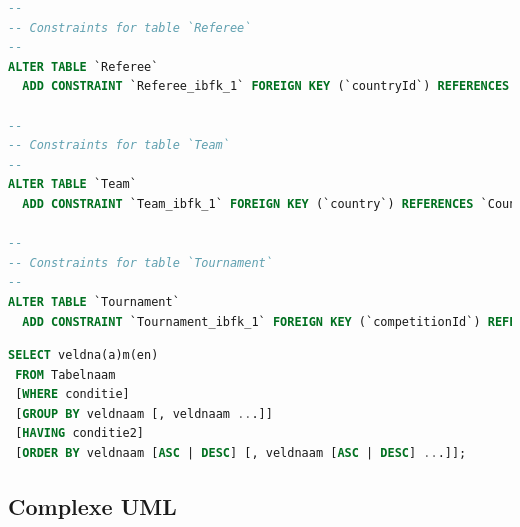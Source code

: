 \documentclass[11pt]{article}
\begin{document}
\begin{framed}
\begin{lstlisting}[language=sql]
--
-- Constraints for table `Referee`
--
ALTER TABLE `Referee`
  ADD CONSTRAINT `Referee_ibfk_1` FOREIGN KEY (`countryId`) REFERENCES `Country` (`id`);

--
-- Constraints for table `Team`
--
ALTER TABLE `Team`
  ADD CONSTRAINT `Team_ibfk_1` FOREIGN KEY (`country`) REFERENCES `Country` (`id`);

--
-- Constraints for table `Tournament`
--
ALTER TABLE `Tournament`
  ADD CONSTRAINT `Tournament_ibfk_1` FOREIGN KEY (`competitionId`) REFERENCES `Competition` (`id`);
     \end{lstlisting}
     \end{framed}








\begin{framed}
\begin{lstlisting}[language=sql]
SELECT veldna(a)m(en)
 FROM Tabelnaam
 [WHERE conditie]
 [GROUP BY veldnaam [, veldnaam ...]]
 [HAVING conditie2]
 [ORDER BY veldnaam [ASC | DESC] [, veldnaam [ASC | DESC] ...]];
\end{lstlisting}
\end{framed}




\subsection{Complexe UML}
\end{document}
